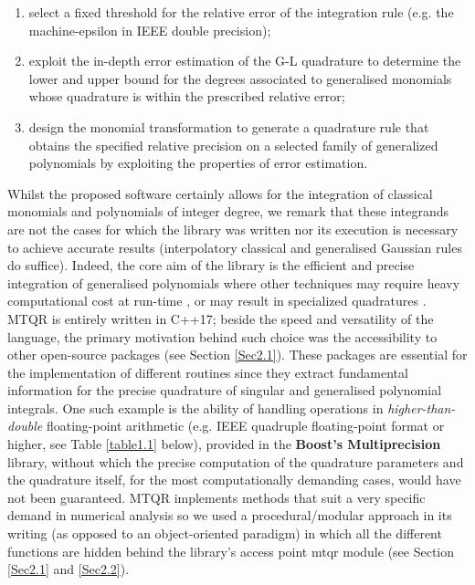 \documentclass[a4paper, twosided]{book}
\begin{document}
\begin{enumerate}
    \item select a fixed threshold for the relative error of the integration rule (e.g. the machine-epsilon in IEEE double precision);
    \item exploit the in-depth error estimation of the G-L quadrature to determine the lower and upper bound for the degrees associated to generalised monomials whose quadrature is within the prescribed relative error;
    \item design the monomial transformation to generate a quadrature rule that obtains the specified relative precision on a selected family of generalized polynomials by exploiting the properties of error estimation.
\end{enumerate}

\noindent
Whilst the proposed software certainly allows for the integration of classical monomials and polynomials of integer degree, we remark that these integrands are not the cases for which the library was written nor its execution is necessary to achieve accurate results (interpolatory classical and generalised Gaussian rules do suffice). Indeed, the core aim of the library is the efficient and precise integration of generalised polynomials where other techniques may require heavy computational cost at run-time \cite{Gautschi94}, or may result in specialized quadratures \cite{Ma1996,Milovanovic2015}. MTQR is entirely written in C++17; beside the speed and versatility of the language, the primary motivation behind such choice was the accessibility to other open-source packages (see Section \ref{Sec2.1}). These packages are essential for the implementation of different routines since they extract fundamental information for the precise quadrature of singular and generalised polynomial integrals. One such example is the ability of handling operations in \textsl{higher-than-double} floating-point arithmetic (e.g. IEEE quadruple floating-point format or higher, see Table \ref{table1.1} below), provided in the \color{poliDarkBlue} \textbf{Boost's Multiprecision} \color{black} library, without which the precise computation of the quadrature parameters and the quadrature itself, for the most computationally demanding cases, would have not been guaranteed. MTQR implements methods that suit a very specific demand in numerical analysis so we used a procedural/modular approach in its writing (as opposed to an object-oriented paradigm) in which all the different functions are hidden behind the library's access point \colorbox{poliGrayBlue}{mtqr} \color{black} module (see Section \ref{Sec2.1} and \ref{Sec2.2}).
\end{document}
